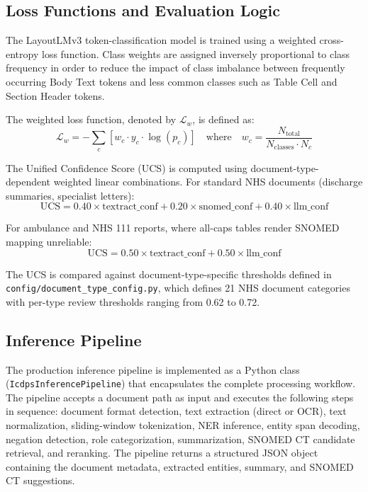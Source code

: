 \subsection{Loss Functions and Evaluation Logic}

The LayoutLMv3 token-classification model is trained using a weighted cross-entropy loss function. Class weights are assigned inversely proportional to class frequency in order to reduce the impact of class imbalance between frequently occurring Body Text tokens and less common classes such as Table Cell and Section Header tokens.

The weighted loss function, denoted by $\mathcal{L}_w$, is defined as:
\begin{equation}
\mathcal{L}_w = -\sum_{c} \left[ w_c \cdot y_c \cdot \log(p_c) \right] \quad \text{where} \quad w_c = \frac{N_{\text{total}}}{N_{\text{classes}} \cdot N_c}
\label{eq:weighted_loss}
\end{equation}

The Unified Confidence Score (UCS) is computed using document-type-dependent weighted linear combinations. For standard NHS documents (discharge summaries, specialist letters):
\begin{equation}
\text{UCS} = 0.40 \times \text{textract\_conf} + 0.20 \times \text{snomed\_conf} + 0.40 \times \text{llm\_conf}
\label{eq:ucs_standard}
\end{equation}

For ambulance and NHS 111 reports, where all-caps tables render SNOMED mapping unreliable:
\begin{equation}
\text{UCS} = 0.50 \times \text{textract\_conf} + 0.50 \times \text{llm\_conf}
\label{eq:ucs_ambulance}
\end{equation}

The UCS is compared against document-type-specific thresholds defined in \texttt{config/\allowbreak document\_type\_\allowbreak config.py}, which defines 21 NHS document categories with per-type review thresholds ranging from 0.62 to 0.72.

\subsection{Inference Pipeline}
The production inference pipeline is implemented as a Python class (\texttt{Icdps\-Inference\-Pipeline}) that encapsulates the complete processing workflow. The pipeline accepts a document path as input and executes the following steps in sequence: document format detection, text extraction (direct or OCR), text normalization, sliding-window tokenization, NER inference, entity span decoding, negation detection, role categorization, summarization, SNOMED CT candidate retrieval, and reranking. The pipeline returns a structured JSON object containing the document metadata, extracted entities, summary, and SNOMED CT suggestions.

